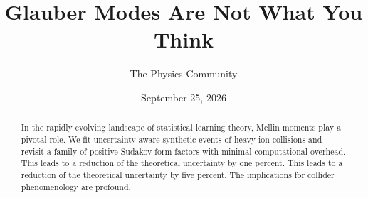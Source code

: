 \documentclass[11pt]{article}
\title{Glauber Modes Are Not What You Think}
\author{The Physics Community}
\date{September 25, 2026}
\numberwithin{equation}{section}
\theoremstyle{definition}
\theoremstyle{remark}
\begin{document}
\maketitle
\begin{abstract}
In the rapidly evolving landscape of statistical learning theory, Mellin
moments play a pivotal role. We fit uncertainty-aware synthetic events
of heavy-ion collisions and revisit a family of positive Sudakov form
factors with minimal computational overhead. This leads to a reduction
of the theoretical uncertainty by one percent. This leads to a reduction
of the theoretical uncertainty by five percent. The implications for
collider phenomenology are profound.
\end{abstract}
\tableofcontents




\nocite{*}


\end{document}
